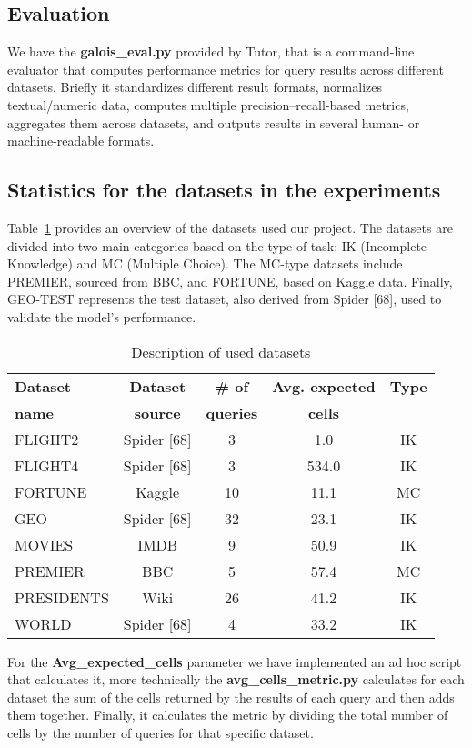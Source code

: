 \documentclass[12pt,a4paper]{article}
\begin{document}
\subsection{Evaluation}
We have the \textbf{galois\_eval.py} provided by Tutor, that is a command-line evaluator that computes performance metrics for query results across different datasets.
Briefly it standardizes different result formats, normalizes textual/numeric data, computes multiple precision–recall-based metrics, aggregates them across datasets, and outputs results in several human- or machine-readable formats.

\subsection{Statistics for the datasets in the experiments}
Table~\ref{tab:datasets} provides an overview of the datasets used our project. The datasets are divided into two main categories based on the type of task: IK (Incomplete Knowledge) and MC (Multiple Choice).
The MC-type datasets include PREMIER, sourced from BBC, and FORTUNE, based on Kaggle data.
Finally, GEO-TEST represents the test dataset, also derived from Spider [68], used to validate the model's performance.

\begin{table}[h]
\centering
\begin{tabular}{lcccc}
\toprule
\textbf{Dataset} & \textbf{Dataset} & \textbf{\# of} & \textbf{Avg. expected} & \textbf{Type} \\
\textbf{name} & \textbf{source} & \textbf{queries} & \textbf{cells} & \\
\midrule
FLIGHT2 & Spider [68] & 3 & 1.0 & IK \\
FLIGHT4 & Spider [68] & 3 & 534.0 & IK \\
FORTUNE & Kaggle & 10 & 11.1 & MC \\
GEO & Spider [68] & 32 & 23.1 & IK \\
MOVIES & IMDB & 9 & 50.9 & IK \\
PREMIER & BBC & 5 & 57.4 & MC \\
PRESIDENTS & Wiki & 26 & 41.2 & IK \\
WORLD & Spider [68] & 4 & 33.2 & IK \\


\bottomrule
\end{tabular}
\caption{Description of used datasets}
\label{tab:datasets}
\end{table}


For the \textbf{Avg\_expected\_cells} parameter we have implemented an ad hoc script that calculates it, more technically the \textbf{avg\_cells\_metric.py} calculates for each dataset the sum of the cells returned by the results of each query and then adds them together.
Finally, it calculates the metric by dividing the total number of cells by the number of queries for that specific dataset.
\end{document}
